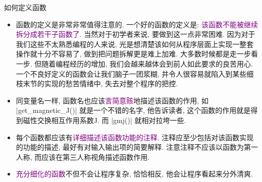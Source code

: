 \documentclass{beamer}
\newcommand{\purple}{\textcolor{purple}}
\begin{document}
    \begin{frame}[fragile]{如何定义函数}
      \begin{block}{}
        \begin{itemize}\small
          \item 函数的定义是非常非常值得注意的. 一个好的函数的定义是: \purple{该函数不能被继续拆分成若干子函数了}. 当然对于初学者来说, 要做到这一点非常困难. 因为对于我们这些不太熟悉编程的人来说, 光是想清楚该如何从程序层面上实现一整套操作就十分不容易了, 做到把问题拆解更是难上加难. 大多数时候都是走一步看一步. 但随着编程经历的增加, 我们会越来越体会到前人如此要求的良苦用心. 一个不良好定义的函数会让我们脑子一团浆糊, 并令人很容易就陷入到某些细枝末节的实现的愁苦情绪中, 失去对整个程序的把控.
          \item 同变量名一样, 函数名也应该\purple{言简意赅}地描述该函数的作用, 如 \cverb|get_magnetic_J()| 就是一个不错的名字, 他告诉读者, 这个函数的作用就是得到磁性交换相互作用系数J. 而 \cverb|gmj()| 就相对拉垮一些.
          \item 每个函数都应该有\purple{详细描述该函数功能的注释}. 注释应至少包括对该函数实现的功能的描述, 最好有对输入输出项的简要解释. 注意注释不应该以函数为第一人称, 而应该在第三人称视角描述函数作用.
          \item \purple{充分细化的函数}不但不会让程序复杂, 恰恰相反, 他会让程序看起来分外清爽.
        \end{itemize}
      \end{block}
    \end{frame}
\end{document}
